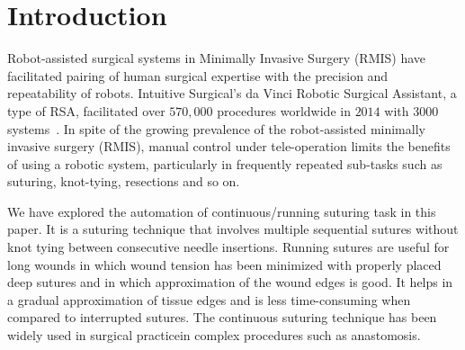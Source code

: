 \section{Introduction}
\label{sec:intro}
Robot-assisted surgical systems in Minimally Invasive Surgery (RMIS)
have facilitated pairing of human surgical expertise with the precision and repeatability of robots. Intuitive Surgical's da Vinci Robotic Surgical Assistant, a type of RSA, facilitated over $570,000$ procedures worldwide in $2014$ with $3000$ systems~\cite{AnnualReport2014}.
In spite of the growing prevalence of the robot-assisted minimally invasive surgery (RMIS), manual control under tele-operation limits 
the benefits of using a robotic system, particularly in frequently repeated sub-tasks such as suturing, knot-tying, resections and so on. 



We have explored the automation of continuous/running suturing task in this paper. It is a suturing technique that involves multiple sequential sutures without knot tying between consecutive needle insertions. Running sutures are useful for long wounds in which wound tension has been minimized with properly placed deep sutures and in which approximation of the wound edges is good. It helps in a gradual approximation of tissue edges and is less time-consuming when compared to interrupted sutures. The continuous suturing technique has been widely used in surgical practice\tocite in complex procedures such as  anastomosis\tocite. 

